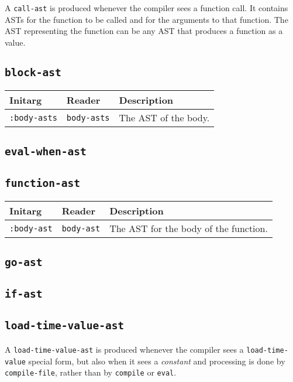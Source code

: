 A \texttt{call-ast} is produced whenever the compiler sees a function
call.  It contains ASTs for the function to be called and for the
arguments to that function.  The AST representing the function can be
any AST that produces a function as a value.

\subsection{\texttt{block-ast}}

\begin{tabular}{|l|l|l|}
\hline
Initarg & Reader & Description\\
\hline\hline
\texttt{:body-asts} & \texttt{body-asts} & The AST of the body.\\
\hline
\end{tabular}

\subsection{\texttt{eval-when-ast}}
\subsection{\texttt{function-ast}}

\begin{tabular}{|l|l|l|}
\hline
Initarg & Reader & Description\\
\hline\hline
\texttt{:body-ast} & \texttt{body-ast} & The AST for the body of the function.\\
\hline
\end{tabular}


\subsection{\texttt{go-ast}}
\subsection{\texttt{if-ast}}

\subsection{\texttt{load-time-value-ast}}

A \texttt{load-time-value-ast} is produced whenever the compiler sees
a \texttt{load-time-value} special form, but also when it sees a
\emph{constant} and processing is done by \texttt{compile-file},
rather than by \texttt{compile} or \texttt{eval}.  


